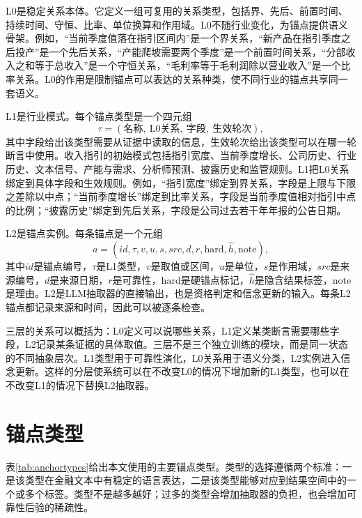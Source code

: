 L0是稳定关系本体。它定义一组可复用的关系类型，包括界、先后、前置时间、持续时间、守恒、比率、单位换算和作用域。L0不随行业变化，为锚点提供语义骨架。例如，“当前季度值落在指引区间内”是一个界关系，“新产品在指引季度之后投产”是一个先后关系，“产能爬坡需要两个季度”是一个前置时间关系，“分部收入之和等于总收入”是一个守恒关系，“毛利率等于毛利润除以营业收入”是一个比率关系。L0的作用是限制锚点可以表达的关系种类，使不同行业的锚点共享同一套语义。

L1是行业模式。每个锚点类型是一个四元组
\begin{equation}
\tau=(\text{名称},\ \text{L0关系},\ \text{字段},\ \text{生效轮次}),
\label{eq:l1}
\end{equation}
其中字段给出该类型需要从证据中读取的信息，生效轮次给出该类型可以在哪一轮断言中使用。收入指引的初始模式包括指引宽度、当前季度增长、公司历史、行业历史、文本信号、产能与需求、分析师预测、披露历史和监管规则。L1把L0关系绑定到具体字段和生效规则。例如，“指引宽度”绑定到界关系，字段是上限与下限之差除以中点；“当前季度增长”绑定到比率关系，字段是当前季度值相对指引中点的比例；“披露历史”绑定到先后关系，字段是公司过去若干年年报的公告日期。

L2是锚点实例。每条锚点是一个元组
\begin{equation}
a=(id,\tau,v,u,s,src,d,r,\text{hard},\hat h,\text{note}),
\label{eq:l2}
\end{equation}
其中$id$是锚点编号，$\tau$是L1类型，$v$是取值或区间，$u$是单位，$s$是作用域，$src$是来源编号，$d$是来源日期，$r$是可靠性，$\text{hard}$是硬锚点标记，$\hat h$是隐含结果标签，$\text{note}$是理由。L2是LLM抽取器的直接输出，也是资格判定和信念更新的输入。每条L2锚点都记录来源和时间，因此可以被逐条检查。

三层的关系可以概括为：L0定义可以说哪些关系，L1定义某类断言需要哪些字段，L2记录某条证据的具体取值。三层不是三个独立训练的模块，而是同一状态的不同抽象层次。L1类型用于可靠性演化，L0关系用于语义分类，L2实例进入信念更新。这样的分层使系统可以在不改变L0的情况下增加新的L1类型，也可以在不改变L1的情况下替换L2抽取器。

\section{锚点类型}

表\ref{tab:anchortypes}给出本文使用的主要锚点类型。类型的选择遵循两个标准：一是该类型在金融文本中有稳定的语言表达，二是该类型能够对应到结果空间中的一个或多个标签。类型不是越多越好；过多的类型会增加抽取器的负担，也会增加可靠性后验的稀疏性。

